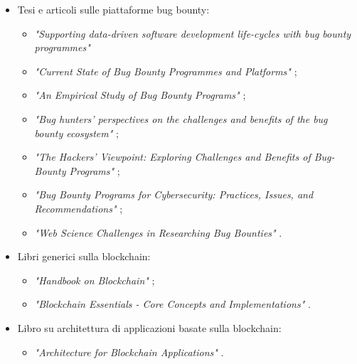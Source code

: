 \begin{itemize}

\item Tesi e articoli sulle piattaforme bug bounty:
\begin{itemize}

\item \textit{"Supporting data-driven software development life-cycles with bug bounty programmes"} \cite{walshe2023bountythesis}

\item \textit{"Current State of Bug Bounty Programmes and Platforms"} \cite{walshe2023bountythesis3};

\item \textit{"An Empirical Study of Bug Bounty Programs"} \cite{walshe2020bountypaper};

\item \textit{"Bug hunters' perspectives on the challenges and benefits of the bug bounty ecosystem"} \cite{akgul2023bughunters};

\item \textit{"The Hackers' Viewpoint: Exploring Challenges and Benefits of Bug-Bounty Programs"} \cite{akgul2020bughunters};

\item \textit{"Bug Bounty Programs for Cybersecurity: Practices, Issues, and Recommendations"} \cite{malladi2020bugbounty};

\item \textit{"Web Science Challenges in Researching Bug Bounties"} \cite{fryer2017bugbounty}.

\end{itemize}

\item Libri generici sulla blockchain:
\begin{itemize}

\item \textit{"Handbook on Blockchain"} \cite{tran2022blockchain};

\item \textit{"Blockchain Essentials - Core Concepts and Implementations"} \cite{mangrulkar2024blockchain}.

\end{itemize}

\item Libro su architettura di applicazioni basate sulla blockchain:
\begin{itemize}

\item \textit{"Architecture for Blockchain Applications"} \cite{xu2019blockarch}.


\end{itemize}
\end{itemize}
